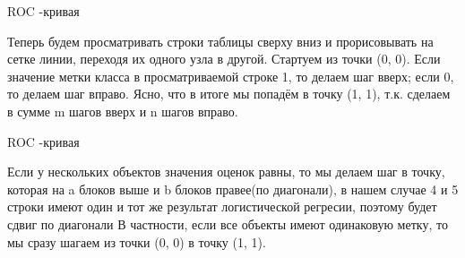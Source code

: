 \documentclass{beamer}
\begin{document}
\begin{frame}{ROC -кривая}

Теперь будем просматривать строки таблицы сверху вниз и прорисовывать на сетке линии, переходя их одного узла в другой.
 Стартуем из точки (0, 0). 
 Если значение метки класса в просматриваемой строке 1, то делаем шаг вверх; если 0, то делаем шаг вправо. 
 Ясно, что в итоге мы попадём в точку (1, 1), т.к. сделаем в сумме m шагов вверх и n шагов вправо.

\end{frame}


\begin{frame}{ROC -кривая}

Если у нескольких объектов значения оценок равны, 
то мы делаем шаг в точку, которая на a блоков выше и b блоков правее(по диагонали), 
в нашем случае  4 и 5 строки имеют один и тот же  результат логистической регресии,
 поэтому будет сдвиг  по диагонали
В частности, если все объекты 
имеют одинаковую метку, то мы сразу шагаем из точки (0, 0) в точку (1, 1).


\end{frame}





\end{document}
